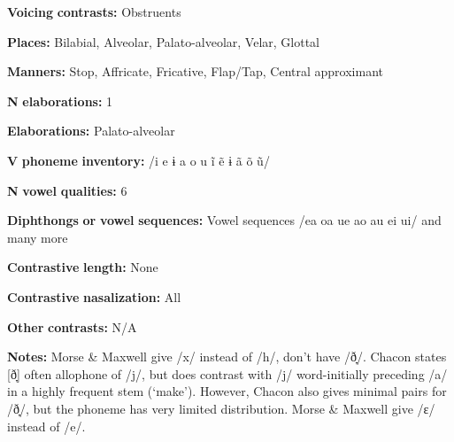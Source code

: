 \documentclass[output=paper]{langsci/langscibook}
\begin{document}
\begin{styleBody}
\textbf{Voicing} \textbf{contrasts:} Obstruents
\end{styleBody}

\begin{styleBody}
\textbf{Places:} Bilabial, Alveolar, Palato-alveolar, Velar, Glottal
\end{styleBody}

\begin{styleBody}
\textbf{Manners:} Stop, Affricate, Fricative, Flap/Tap, Central approximant
\end{styleBody}

\begin{styleBody}
\textbf{N} \textbf{elaborations:} 1
\end{styleBody}

\begin{styleBody}
\textbf{Elaborations:} Palato-alveolar
\end{styleBody}

\begin{styleBody}
\textbf{V} \textbf{phoneme} \textbf{inventory:} /i e ɨ a o u ĩ ẽ ɨ ã õ ũ/
\end{styleBody}

\begin{styleBody}
\textbf{N} \textbf{vowel} \textbf{qualities:} 6
\end{styleBody}

\begin{styleBody}
\textbf{Diphthongs} \textbf{or} \textbf{vowel} \textbf{sequences:} Vowel sequences /ea oa ue ao au ei ui/ and many more
\end{styleBody}

\begin{styleBody}
\textbf{Contrastive} \textbf{length:} None
\end{styleBody}

\begin{styleBody}
\textbf{Contrastive} \textbf{nasalization:} All
\end{styleBody}

\begin{styleBody}
\textbf{Other} \textbf{contrasts:} N/A
\end{styleBody}

\begin{styleBody}
\textbf{Notes:} Morse \& Maxwell give /x/ instead of /h/, don’t have /ð̞/. Chacon states [ð̞] often allophone of /j/, but does contrast with /j/ word-initially preceding /a/ in a highly frequent stem (‘make’). However, Chacon also gives minimal pairs for /ð̞/, but the phoneme has very limited distribution. Morse \& Maxwell give /ɛ/ instead of /e/.
\end{styleBody}
\end{document}

